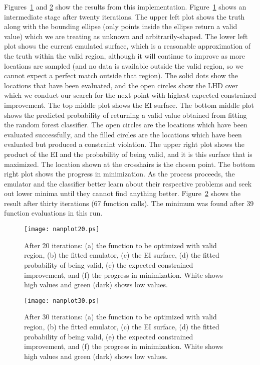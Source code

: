 \documentclass[12pt]{article}
\begin{document}
Figures~\ref{fig:ex1.20} and \ref{fig:ex1.30} show the results from
this implementation.  Figure~\ref{fig:ex1.20} shows an intermediate
stage after twenty iterations.  The upper left plot shows the truth
along with the bounding ellipse (only points inside the ellipse return
a valid value) which we are treating as unknown and
arbitrarily-shaped.  The lower left plot shows the current emulated
surface, which is a reasonable approximation of the truth within the
valid region, although it will continue to improve as more locations
are sampled (and no data is available outside the valid region, so we
cannot expect a perfect match outside that region).  The solid dots
show the locations that have been evaluated, and the open circles show
the LHD over which we conduct our search for the next point with
highest expected constrained improvement.  The top middle plot shows
the EI surface.  The bottom middle plot shows the predicted
probability of returning a valid value obtained from fitting the
random forest classifier.  The open circles are the locations which
have been evaluated successfully, and the filled circles are the
locations which have been evaluated but produced a constraint
violation.  The upper right plot shows the product of the EI and the
probability of being valid, and it is this surface that is maximized.
The location shown at the crosshairs is the chosen point.  The bottom
right plot shows the progress in minimization.  As the process
proceeds, the emulator and the classifier better learn about their
respective problems and seek out lower minima until they cannot find
anything better.  Figure~\ref{fig:ex1.30} shows the result after
thirty iterations (67 function calls).  The minimum was found after 39
function evaluations in this run.

\begin{figure}[htb]
\begin{center}
\texttt{[image: nanplot20.ps]}
\end{center}
\caption{After 20 iterations: (a) the function to be optimized with valid
  region, (b) the fitted emulator, (c) the EI surface, (d) the
  fitted probability of being valid, (e) the expected constrained
  improvement, and (f) the progress in minimization.  White shows high
  values and green (dark) shows low values.}
\label{fig:ex1.20}
\end{figure}

\begin{figure}[htb]
\begin{center}
\texttt{[image: nanplot30.ps]}
\end{center}
\caption{After 30 iterations: (a) the function to be optimized with valid
  region, (b) the fitted emulator, (c) the EI surface, (d) the
  fitted probability of being valid, (e) the expected constrained
  improvement, and (f) the progress in minimization.  White shows high
  values and green (dark) shows low values.}
\label{fig:ex1.30}
\end{figure}
\end{document}
